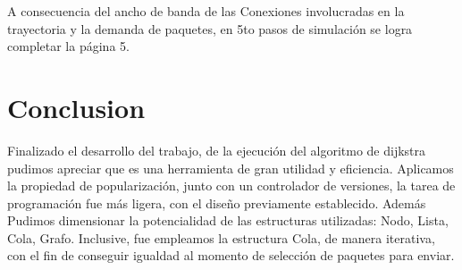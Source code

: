 \documentclass[12pt]{article} %
\begin{document}
\begin{figure}[H] %
\label{fig:config_1_run6}
\end{figure}

A consecuencia del ancho de banda de las Conexiones involucradas en la trayectoria y la demanda de paquetes, en 5to pasos de simulación se logra completar la página 5.

\begin{figure}[H] %
\label{fig:config_1_run7}
\end{figure}


\section{Conclusion} %
Finalizado el desarrollo del trabajo, de la ejecución del algoritmo de dijkstra pudimos apreciar que es una herramienta de gran utilidad y eficiencia.
Aplicamos la propiedad de popularización, junto con un controlador de versiones, la tarea de programación fue más ligera, con el diseño previamente establecido.
Además Pudimos dimensionar la potencialidad de las estructuras utilizadas: Nodo, Lista, Cola, Grafo. Inclusive, fue empleamos la estructura Cola, de manera iterativa, con el fin de conseguir igualdad al momento de selección de paquetes para enviar.
\end{document}
